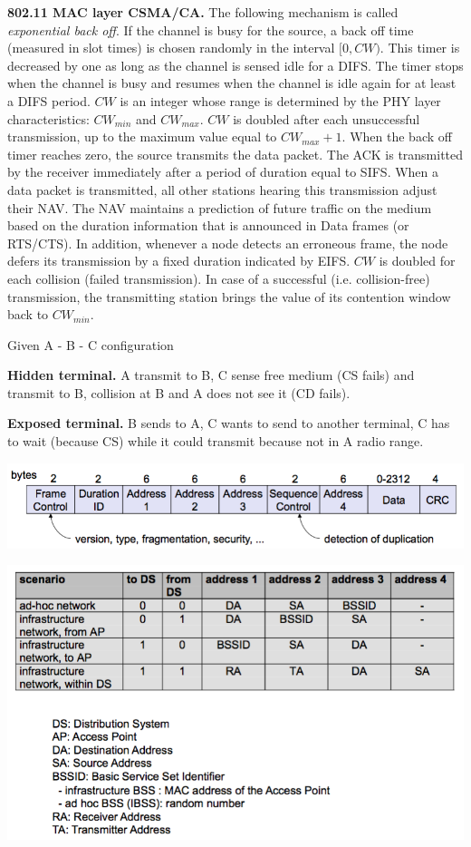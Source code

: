 \documentclass[10pt,twocolumn]{article}
\renewcommand{\bf}{\textbf}
\begin{document}
\bf{802.11 MAC layer CSMA/CA.} The following mechanism is called \emph{exponential back off}. If the channel is busy for the source, a back off time (measured in slot times) is chosen randomly in the interval $[0,CW)$. This timer is decreased by one as long as the channel is sensed idle for a DIFS. The timer stops when the channel is busy and resumes when the channel is idle again for at least a DIFS period. $CW$ is an integer whose range is determined by the PHY layer characteristics: $CW_{min}$ and $CW_{max}$. $CW$ is doubled after each unsuccessful transmission, up to the maximum value equal to $CW_{max} + 1$. When the back off timer reaches zero, the source transmits the data packet. The ACK is transmitted by the receiver immediately after a period of duration equal to SIFS. When a data packet is transmitted, all other stations hearing this transmission adjust their NAV. The NAV maintains a prediction of future traffic on the medium based on the duration information that is announced in Data frames (or RTS/CTS). In addition, whenever a node detects an erroneous frame, the node defers its transmission by a fixed duration indicated by EIFS. $CW$ is doubled for each collision (failed transmission). In case of a successful (i.e. collision-free) transmission, the transmitting station brings the value of its contention window back to $CW_{min}$. 


Given A - B - C configuration

\bf{Hidden terminal.} A transmit to B, C sense free medium (CS fails) and transmit to B, collision at B and A does not see it (CD fails).

\bf{Exposed terminal.} B sends to A, C wants to send to another terminal, C has to wait (because CS) while it could transmit because not in A radio range.

\includegraphics[width=\linewidth]{figures/package-frame-1.png}

\includegraphics[width=\linewidth]{figures/package-frame-2.png}
\end{document}
